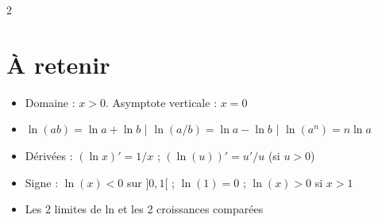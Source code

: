 \documentclass[11pt,a4paper]{article}
\begin{document}
\begin{paracol}{2}
\section{À retenir}
\begin{itemize}
  \item Domaine : $x>0$. Asymptote verticale : $x=0$
  \item $\ln(ab)=\ln a+\ln b$ | $\ln(a/b)=\ln a-\ln b$ | $\ln(a^n)=n\ln a$
  \item Dérivées : $(\ln x)'=1/x$ ; $(\ln(u))'=u'/u$ (si $u>0$)
  \item Signe : $\ln(x)<0$ sur $]0,1[$ ; $\ln(1)=0$ ; $\ln(x)>0$ si $x>1$
  \item Les 2 limites de ln et les 2 croissances comparées
\end{itemize}

\end{paracol}
\end{document}
